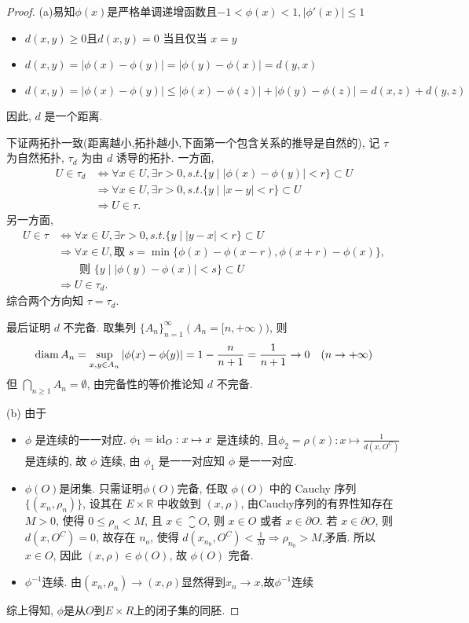 \begin{proof}
    (a)易知$\phi (x)$是严格单调递增函数且$-1<\phi(x)<1,|\phi '(x)|\leq 1$
    \begin{itemize}
    \item $d(x,y)\geq 0$且$d(x,y)=0$ 当且仅当 $x=y$
    \item $d(x,y)=|\phi(x)-\phi(y)|=|\phi(y)-\phi(x)|=d(y,x)$
    \item $d(x,y)=|\phi(x)-\phi(y)|\leq |\phi(x)-\phi(z)|+|\phi(y)-\phi(z)|=d(x,z)+d(y,z)$
    \end{itemize}
    因此, $d$ 是一个距离.

    下证两拓扑一致(距离越小,拓扑越小,下面第一个包含关系的推导是自然的), 
    记 $\tau$ 为自然拓扑, $\tau_d$ 为由 $d$ 诱导的拓扑. 一方面,
    \begin{align*}
        U\in\tau_d
        & \Leftrightarrow\forall x\in U,\exists r>0,s.t.\{y\mid|\phi(x)-\phi(y)|<r\}\subset U\\
        & \Rightarrow\forall x\in U,\exists r>0,s.t.\{y\mid|x-y|<r\}\subset U\\
        & \Rightarrow U\in\tau.
    \end{align*}
    另一方面,
    \begin{align*}
    U\in\tau
    & \Leftrightarrow\forall x\in U,\exists r>0,s.t.\{y\mid |y-x|<r\}\subset U \\
    & \Rightarrow\forall x\in U,\text{取\ }s=\min\{\phi(x)-\phi(x-r),\phi(x+r)-\phi(x)\}, \\
    & \qquad\text{则\ }\{y\mid |\phi(y)-\phi(x)|<s\}\subset U \\
    & \Rightarrow U\in\tau_d.
    \end{align*}
    综合两个方向知 $\tau=\tau_d$.

    最后证明 $d$ 不完备. 取集列 $\{A_n\}_{n=1}^{\infty}(A_n=[n,+\infty))$, 则
    \[\operatorname{diam} A_n=\sup_{x,y\in A_n}|\phi(x)-\phi(y)|=1-\frac{n}{n+1}=\frac{1}{n+1}\to 0\quad(n\to +\infty)\]
    但 $\bigcap\limits_{n\geq 1}A_n=\emptyset$, 由完备性的等价推论知 $d$ 不完备.

    (b) 由于
    \begin{itemize}
    \item $\phi$ 是连续的一一对应. $\phi_1=\mathrm{id}_O:x\mapsto x$ 是连续的, 且$\phi_2=\rho(x):x\mapsto\frac{1}{d(x,O^C)}$是连续的,
          故 $\phi$ 连续, 由 $\phi_1$ 是一一对应知 $\phi$ 是一一对应.
    \item $\phi(O)$是闭集. 只需证明$\phi(O)$完备,
          任取 $\phi(O)$ 中的 Cauchy 序列 $\{(x_n,\rho_n)\}$,
          设其在 $E\times\mathbb{R}$ 中收敛到 $(x,\rho)$,
          由Cauchy序列的有界性知存在 $M>0$, 使得 $0\leq\rho_n<M$, 且 $x\in\closure{O}$, 则 $x\in O$ 或者 $x\in\partial O$.
          若 $x\in\partial O$, 则 $d(x,O^C)=0$, 故存在 $n_o$, 使得 $d(x_{n_0},O^C)<\frac{1}{M}\Rightarrow\rho_{n_0}>M$,矛盾.
          所以 $x\in O$, 因此 $(x,\rho)\in\phi(O)$, 故 $\phi(O)$ 完备.
    \item $\phi^{-1}$连续. 由$(x_n,\rho_n)\rightarrow (x,\rho)$显然得到$x_n\rightarrow x$,故$\phi^{-1}$连续
    \end{itemize}
    综上得知, $\phi$是从$O$到$E\times R$上的闭子集的同胚.


\end{proof}
